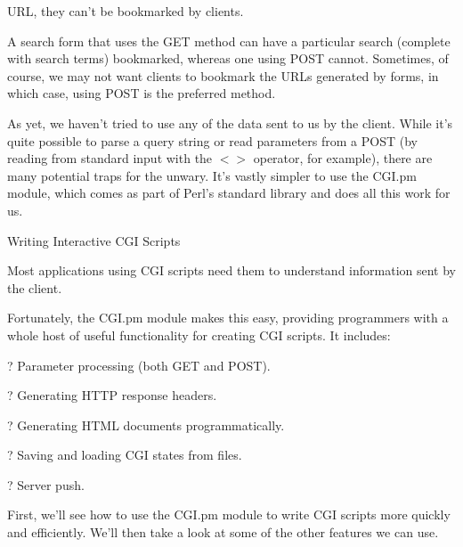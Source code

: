 \documentclass[a4paper,11pt]{book}
\begin{document}
\noindent URL, they can't be bookmarked by clients.

\noindent 

\noindent A search form that uses the GET method can have a particular search (complete with search terms) bookmarked, whereas one using POST cannot. Sometimes, of course, we may not want clients to bookmark the URLs generated by forms, in which case, using POST is the preferred method.

\noindent 

\noindent As yet, we haven't tried to use any of the data sent to us by the client. While it's quite possible to parse a query string or read parameters from a POST (by reading from standard input with the $<$$>$ operator, for example), there are many potential traps for the unwary. It's vastly simpler to use the CGI.pm module, which comes as part of Perl's standard library and does all this work for us.

\noindent 

\noindent 

\noindent Writing Interactive CGI Scripts

\noindent 

\noindent Most applications using CGI scripts need them to understand information sent by the client.

\noindent Fortunately, the CGI.pm module makes this easy, providing programmers with a whole host of useful functionality for creating CGI scripts. It includes:

\noindent 

\noindent ? Parameter processing (both GET and POST).

\noindent 

\noindent ? Generating HTTP response headers.

\noindent 

\noindent ? Generating HTML documents programmatically.

\noindent 

\noindent ? Saving and loading CGI states from files.

\noindent 

\noindent ? Server push.

\noindent 

\noindent First, we'll see how to use the CGI.pm module to write CGI scripts more quickly and efficiently. We'll then take a look at some of the other features we can use.

\noindent 

\noindent 
\end{document}

